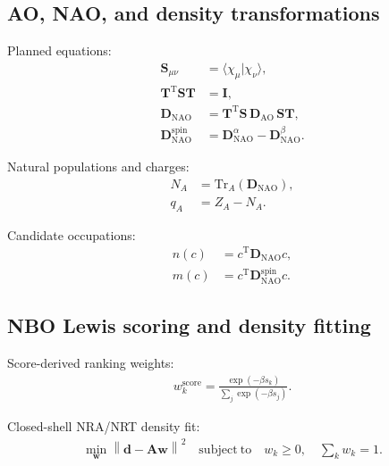 \documentclass[11pt]{article}
\newcommand{\ao}{\mathrm{AO}}
\newcommand{\nao}{\mathrm{NAO}}
\newcommand{\dens}{\mathbf{D}}
\newcommand{\overlap}{\mathbf{S}}
\begin{document}
\subsection{AO, NAO, and density transformations}
Planned equations:
\begin{equation}
\begin{aligned}
	\overlap_{\mu\nu} &= \langle \chi_\mu | \chi_\nu \rangle, \\
	\mathbf{T}^{\mathrm{T}} \overlap \mathbf{T} &= \mathbf{I}, \\
	\dens_{\nao} &= \mathbf{T}^{\mathrm{T}} \overlap\, \dens_{\ao}\, \overlap \mathbf{T}, \\
	\dens^{\mathrm{spin}}_{\nao} &= \dens^{\alpha}_{\nao} - \dens^{\beta}_{\nao}.
\end{aligned}
\end{equation}

Natural populations and charges:
\begin{equation}
\begin{aligned}
	N_A &= \mathrm{Tr}_A(\dens_{\nao}), \\
	q_A &= Z_A - N_A.
\end{aligned}
\end{equation}

Candidate occupations:
\begin{equation}
\begin{aligned}
	n(c) &= c^{\mathrm{T}} \dens_{\nao} c, \\
	m(c) &= c^{\mathrm{T}} \dens^{\mathrm{spin}}_{\nao} c.
\end{aligned}
\end{equation}

\subsection{NBO Lewis scoring and density fitting}
Score-derived ranking weights:
\begin{equation}
\begin{aligned}
	w^{\mathrm{score}}_k = \frac{\exp(-\beta s_k)}{\sum_j \exp(-\beta s_j)}.
\end{aligned}
\end{equation}

Closed-shell NRA/NRT density fit:
\begin{equation}
\begin{aligned}
	\min_{\mathbf{w}} \left\| \mathbf{d} - \mathbf{A}\mathbf{w} \right\|^2
	\quad \mathrm{subject\ to} \quad
	w_k \ge 0,\quad \sum_k w_k = 1.
\end{aligned}
\end{equation}
\end{document}
